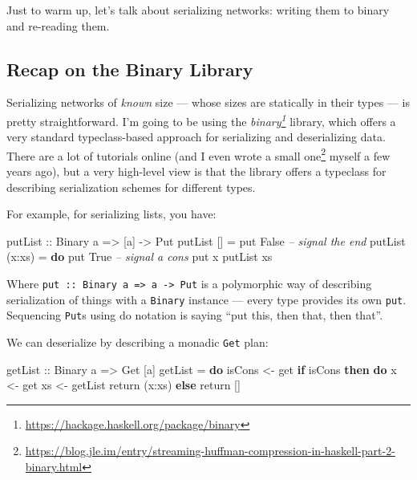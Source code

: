 \documentclass[]{article}
\newenvironment{Shaded}{}{}
\newcommand{\KeywordTok}[1]{\textcolor[rgb]{0.00,0.44,0.13}{\textbf{{#1}}}}
\newcommand{\DataTypeTok}[1]{\textcolor[rgb]{0.56,0.13,0.00}{{#1}}}
\newcommand{\CommentTok}[1]{\textcolor[rgb]{0.38,0.63,0.69}{\textit{{#1}}}}
\newcommand{\OtherTok}[1]{\textcolor[rgb]{0.00,0.44,0.13}{{#1}}}
\newcommand{\FunctionTok}[1]{\textcolor[rgb]{0.02,0.16,0.49}{{#1}}}
\newcommand{\NormalTok}[1]{{#1}}
\renewcommand{\href}[2]{#2\footnote{\url{#1}}}
\begin{document}
Just to warm up, let's talk about serializing networks: writing them to binary
and re-reading them.

\subsection{Recap on the Binary Library}\label{recap-on-the-binary-library}

Serializing networks of \emph{known} size --- whose sizes are statically in
their types --- is pretty straightforward. I'm going to be using the
\emph{\href{https://hackage.haskell.org/package/binary}{binary}} library, which
offers a very standard typeclass-based approach for serializing and
deserializing data. There are a lot of tutorials online (and I even
\href{https://blog.jle.im/entry/streaming-huffman-compression-in-haskell-part-2-binary.html}{wrote
a small one} myself a few years ago), but a very high-level view is that the
library offers a typeclass for describing serialization schemes for different
types.

For example, for serializing lists, you have:

\begin{Shaded}
\begin{Highlighting}[]
\OtherTok{putList ::} \DataTypeTok{Binary} \NormalTok{a }\OtherTok{=>} \NormalTok{[a] }\OtherTok{->} \DataTypeTok{Put}
\NormalTok{putList []     }\FunctionTok{=}
    \NormalTok{put }\DataTypeTok{False}           \CommentTok{-- signal the end}
\NormalTok{putList (x}\FunctionTok{:}\NormalTok{xs) }\FunctionTok{=} \KeywordTok{do}
    \NormalTok{put }\DataTypeTok{True}            \CommentTok{-- signal a cons}
    \NormalTok{put x}
    \NormalTok{putList xs}
\end{Highlighting}
\end{Shaded}

Where \texttt{put\ ::\ Binary\ a\ =\textgreater{}\ a\ -\textgreater{}\ Put} is a
polymorphic way of describing serialization of things with a \texttt{Binary}
instance --- every type provides its own \texttt{put}. Sequencing \texttt{Put}s
using do notation is saying ``put this, then that, then that''.

We can deserialize by describing a monadic \texttt{Get} plan:

\begin{Shaded}
\begin{Highlighting}[]
\OtherTok{getList ::} \DataTypeTok{Binary} \NormalTok{a }\OtherTok{=>} \DataTypeTok{Get} \NormalTok{[a]}
\NormalTok{getList }\FunctionTok{=} \KeywordTok{do}
    \NormalTok{isCons }\OtherTok{<-} \NormalTok{get}
    \KeywordTok{if} \NormalTok{isCons}
      \KeywordTok{then} \KeywordTok{do}
        \NormalTok{x  }\OtherTok{<-} \NormalTok{get}
        \NormalTok{xs }\OtherTok{<-} \NormalTok{getList}
        \NormalTok{return (x}\FunctionTok{:}\NormalTok{xs)}
      \KeywordTok{else}
        \NormalTok{return []}
\end{Highlighting}
\end{Shaded}
\end{document}
